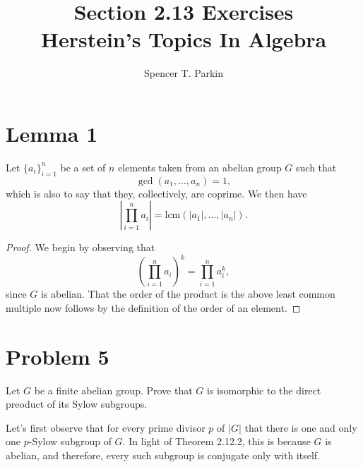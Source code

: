 \documentclass[12pt]{article}
\title{Section 2.13 Exercises\\Herstein's Topics In Algebra}
\author{Spencer T. Parkin}
\newcommand{\lcm}{\mbox{lcm}}
\begin{document}
\maketitle

\section*{Lemma 1}

Let $\{a_i\}_{i=1}^n$ be a set of $n$ elements taken from an abelian group $G$
such that
\begin{equation*}
\gcd(a_1,\dots,a_n)=1,
\end{equation*}
which is also to say that they, collectively, are coprime.  We then have
\begin{equation*}
\left|\prod_{i=1}^n a_i\right|=\lcm(|a_1|,\dots,|a_n|).
\end{equation*}
\begin{proof}
We begin by observing that
\begin{equation*}
\left(\prod_{i=1}^n a_i\right)^k = \prod_{i=1}^n a_i^k,
\end{equation*}
since $G$ is abelian.  That the order of the product is the above least common
multiple now follows by the definition of the order of an element.
\end{proof}

\section*{Problem 5}

Let $G$ be a finite abelian group.  Prove that $G$ is isomorphic to the
direct preoduct of its Sylow subgroups.

Let's first observe that for every prime divisor $p$ of $|G|$ that
there is one and only one $p$-Sylow subgroup of $G$.  In light
of Theorem 2.12.2, this is because $G$ is abelian, and therefore, every such subgroup
is conjugate only with itself.
\end{document}
